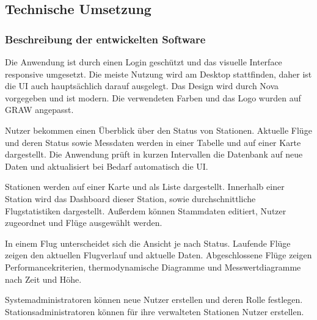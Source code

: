 \subsection{Technische Umsetzung}

\subsubsection{Beschreibung der entwickelten Software}
Die Anwendung ist durch einen Login geschützt und das visuelle Interface responsive umgesetzt.
Die meiste Nutzung wird am Desktop stattfinden, daher ist die UI auch hauptsächlich darauf ausgelegt.
Das Design wird durch Nova vorgegeben und ist modern.
Die verwendeten Farben und das Logo wurden auf GRAW angepasst.

Nutzer bekommen einen Überblick über den Status von Stationen.
Aktuelle Flüge und deren Status sowie Messdaten werden in einer Tabelle und auf einer Karte dargestellt.
Die Anwendung prüft in kurzen Intervallen die Datenbank auf neue Daten und aktualisiert bei Bedarf automatisch die UI.

Stationen werden auf einer Karte und als Liste dargestellt.
Innerhalb einer Station wird das Dashboard dieser Station, sowie durchschnittliche Flugstatistiken dargestellt.
Außerdem können Stammdaten editiert, Nutzer zugeordnet und Flüge ausgewählt werden.

In einem Flug unterscheidet sich die Ansicht je nach Status.
Laufende Flüge zeigen den aktuellen Flugverlauf und aktuelle Daten.
Abgeschlossene Flüge zeigen Performancekriterien, thermodynamische Diagramme und Messwertdiagramme nach Zeit und Höhe.

Systemadministratoren können neue Nutzer erstellen und deren Rolle festlegen.
Stationsadministratoren können für ihre verwalteten Stationen Nutzer erstellen.

\newpage

